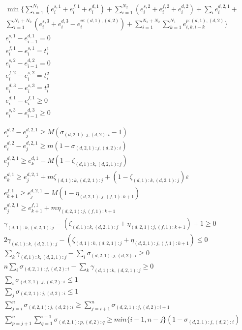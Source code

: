 \documentclass[]{interact}
\theoremstyle{plain}%
\theoremstyle{definition}
\theoremstyle{remark}
\begin{document}
\begin{eqnarray}
\min\{\sum_{i=1}^{N_1} (e^{s,1}_i+e^{f,1}_{i}+e^{d,1}_{i})+\sum_{i=1}^{N_2}(e^{s,2}_i+e^{f,2}_{i}+e^{d,2}_{i}) + \sum_{i}^{} e^{d,2,1}_{i}+\nonumber\\
\sum_{i=1}^{N_1+N_2}(e^{s,3}_i+e^{d,3}_{i}-e^{w:(d,1),(d,2)}_i) +\sum_{i=1}^{N_1+N_2}\sum_{k=1}^{N_1} e^{p:(d,1),(d,2)}_{i,k,i-k}\}\nonumber\\
e^{s,1}_i - e^{d,1}_{i-1} = 0\label{MergeErg:1} \\
e^{f,1}_{i} - e^{s,1}_{i} = t^{1}_i\\
e^{s,2}_i - e^{d,2}_{i-1} = 0\\
e^{f,2}_{i} - e^{s,2}_{i} = t^{2}_i\\
e^{d,3}_{i} - e^{s,3}_{i} = t^{3}_i\\
e^{d,1}_{i} - e^{f,1}_{i} \ge 0\label{MergeErg:6} \\
e^{s,3}_{i} - e^{d,3}_{i-1} \ge 0\label{MergeErg:7} 
\end{eqnarray}


\begin{eqnarray}
e^{d,2}_i-e^{d,2,1}_j\ge M(\sigma_{(d,2,1):j,(d,2):i}-1)\label{MergeErg:8.1}\\
e^{d,2}_i-e^{d,2,1}_j\ge m(1 - \sigma_{(d,2,1):j,(d,2):i})\\
e^{d,2,1}_{j} \ge e^{d,1}_{k} - M(1-\zeta_{(d,1):k,(d,2,1):j})\\ 
e^{d,1}_{k} \ge e^{d,2,1}_{j} + m\zeta_{(d,1):k,(d,2,1):j} +(1-\zeta_{(d,1):k,(d,2,1):j})\varepsilon\\ 
e^{f,1}_{k+1} \ge e^{d,2,1}_{j} - M(1-\eta_{(d,2,1):j,(f,1):k+1})\\
e^{d,2,1}_{j} \ge e^{f,1}_{k+1} + m\eta_{(d,2,1):j,(f,1):k+1}\\
\gamma_{(d,1):k,(d,2,1):j} - (\zeta_{(d,1):k,(d,2,1):j} + \eta_{(d,2,1):j,(f,1):k+1})+1\ge 0\\
2\gamma_{(d,1):k,(d,2,1):j}-(\zeta_{(d,1):k,(d,2,1):j} + \eta_{(d,2,1):j,(f,1):k+1})\le 0\\
\sum_k\gamma_{(d,1):k,(d,2,1):j}-\sum_i \sigma_{(d,2,1):j,(d,2):i} \ge 0\\
n\sum_{i}\sigma_{(d,2,1):j,(d,2):i} - \sum_k\gamma_{(d,1):k,(d,2,1):j}\ge 0\\
\sum_{i}\sigma_{(d,2,1):j,(d,2):i}\le 1\\
\sum_{j}\sigma_{(d,2,1):j,(d,2):i}\le 1\\
\sum_{j=i}^{n}\sigma_{(d,2,1):j,(d,2):i}\ge \sum_{j=i+1}^{n}\sigma_{(d,2,1):j,(d,2):i+1}\\
\sum_{p=j+1}^n\sum_{q=1}^{i-1} \sigma_{(d,2,1):p,(d,2):q} \ge min\{i-1,n-j\}(1-\sigma_{(d,2,1):j,(d,2):i})\label{MergeErg:8.2}
\end{eqnarray}
\end{document}
